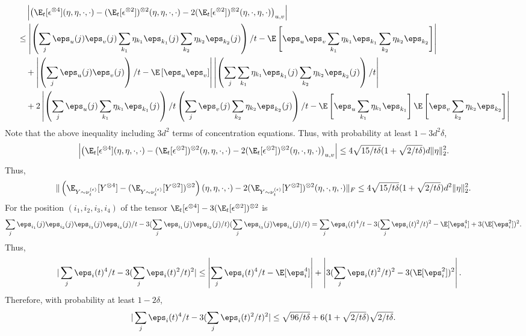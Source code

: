 \begin{align*}
& \quad \left|\left(\E_t[\epsilon^{\otimes4}](\eta,\eta,\cdot,\cdot) - (\E_t[\epsilon^{\otimes2}])^{\otimes 2}(\eta,\eta,\cdot,\cdot) - 2(\E_t[\epsilon^{\otimes2}])^{\otimes 2}(\eta,\cdot,\eta,\cdot) \right)_{u,v}\right|\\
& \le \left| \left(\sum_j \eps_u(j)\eps_v(j)\sum_{k_1}\eta_{k_1}\eps_{k_1}(j)\sum_{k_2}\eta_{k_2}\eps_{k_2}(j)\right)/t- \E\left[ \eps_{u}\eps_{v}\sum_{k_1}\eta_{k_1}\eps_{k_1}\sum_{k_2}\eta_{k_2}\eps_{k_2}\right]\right| \\ 
& \quad + \left| \left(\sum_j \eps_u(j)\eps_v(j)\right)/t -  \E\left[ \eps_{u}\eps_{v}\right]\right|\left|\left(\sum_j\sum_{k_1}\eta_{k_1}\eps_{k_1}(j)\sum_{k_2}\eta_{k_2}\eps_{k_2}(j)\right)/t \right| \\
& \quad + 2\left| \left(\sum_j \eps_u(j)\sum_{k_1}\eta_{k_1}\eps_{k_1}(j)\right)/t\left(\sum_j \eps_v(j)\sum_{k_2}\eta_{k_2}\eps_{k_2}(j)\right)/t- \E\left[ \eps_{u}\sum_{k_1}\eta_{k_1}\eps_{k_1}\right]\E\left[\eps_{v}\sum_{k_2}\eta_{k_2}\eps_{k_2}\right]\right| 
\end{align*}
Note that the above inequality including $3d^2$ terms of concentration equations. Thus, with probability at least $1-3d^2\delta$,
\[
\left|\left(\E_t[\epsilon^{\otimes4}](\eta,\eta,\cdot,\cdot) - (\E_t[\epsilon^{\otimes2}])^{\otimes 2}(\eta,\eta,\cdot,\cdot) - 2(\E_t[\epsilon^{\otimes2}])^{\otimes 2}(\eta,\cdot,\eta,\cdot) \right)_{u,v}\right| 
\le
4\sqrt{15/t\delta}(1+\sqrt{2/t\delta})d\|\eta\|^2_2.  
\]
Thus, 
\[
\| \left(\E_{Y\sim \nu_t^{(\epsilon)}} [Y^{\otimes4}] - (\E_{Y\sim \nu_t^{(\epsilon)}} [Y^{\otimes2}])^{\otimes 2}\right)(\eta,\eta,\cdot,\cdot)  - 2 (\E_{Y\sim \nu_t^{(\epsilon)}} [Y^{\otimes2}])^{\otimes 2}(\eta,\cdot,\eta,\cdot)\|_F \le 4\sqrt{15/t\delta}(1+\sqrt{2/t\delta})d^2\|\eta\|^2_2.
\]
For the position $(i_1,i_2,i_3,i_4)$ of the tensor $\E_t[\epsilon^{\otimes4}] - 3(\E_t[\epsilon^{\otimes2}])^{\otimes 2}$ is
\[
\sum_j \eps_{i_1}(j)\eps_{i_2}(j)\eps_{i_3}(j)\eps_{i_4}(j)/t - 3(\sum_j \eps_{i_1}(j)\eps_{i_2}(j)/t)(\sum_j \eps_{i_3}(j)\eps_{i_4}(j)/t) = \sum_j \eps_i(t)^4/t - 3(\sum_j \eps_i(t)^2/t)^2  - \E[\eps_i^4] + 3(\E[\eps_i^2])^2.
\]  
Thus, 
\begin{align*}
|\sum_j \eps_i(t)^4/t - 3(\sum_j \eps_i(t)^2/t)^2| & \le \left|\sum_j \eps_i(t)^4/t - \E[\eps_i^4]\right| + \left|3(\sum_j \eps_i(t)^2/t)^2 - 3(\E[\eps_i^2])^2\right|. 
\end{align*}
Therefore, with probability at least $1-2\delta$, 
\[
|\sum_j \eps_i(t)^4/t - 3(\sum_j \eps_i(t)^2/t)^2| \le \sqrt{96/t\delta}+ 6(1+\sqrt{2/t\delta})\sqrt{2/t\delta}.
\]
